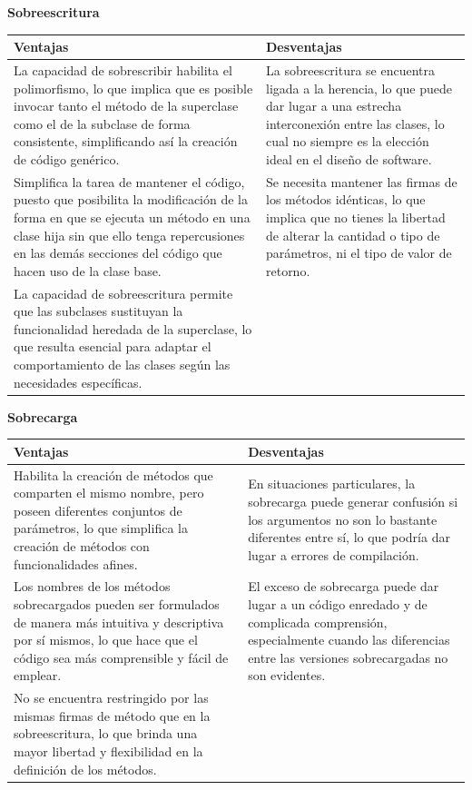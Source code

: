 \documentclass[11pt, twocolumn]{article}
\begin{document}
  \newpage
  \textbf{Sobreescritura}
  \begin{table}[h!]
    \footnotesize	
    \begin{tabular}{|p{}|p{}|}
      \hline
      \textbf{Ventajas} & \textbf{Desventajas} \\ \hline
      La capacidad de sobrescribir habilita el polimorfismo, lo que implica que es posible invocar tanto el método de la superclase como el de la subclase de forma consistente, simplificando así la creación de código genérico. & La sobreescritura se encuentra ligada a la herencia, lo que puede dar lugar a una estrecha interconexión entre las clases, lo cual no siempre es la elección ideal en el diseño de software. \\ \hline
      
      Simplifica la tarea de mantener el código, puesto que posibilita la modificación de la forma en que se ejecuta un método en una clase hija sin que ello tenga repercusiones en las demás secciones del código que hacen uso de la clase base. & Se necesita mantener las firmas de los métodos idénticas, lo que implica que no tienes la libertad de alterar la cantidad o tipo de parámetros, ni el tipo de valor de retorno. \\ \hline
      
      La capacidad de sobreescritura permite que las subclases sustituyan la funcionalidad heredada de la superclase, lo que resulta esencial para adaptar el comportamiento de las clases según las necesidades específicas. & \\ \hline
    \end{tabular}
  \end{table}

  \textbf{Sobrecarga}
  \begin{table}[h!]
    \footnotesize	
    \begin{tabular}{|p{}|p{}|}
      \hline
      \textbf{Ventajas} & \textbf{Desventajas} \\ \hline
      Habilita la creación de métodos que comparten el mismo nombre, pero poseen diferentes conjuntos de parámetros, lo que simplifica la creación de métodos con funcionalidades afines. & En situaciones particulares, la sobrecarga puede generar confusión si los argumentos no son lo bastante diferentes entre sí, lo que podría dar lugar a errores de compilación. \\ \hline

      Los nombres de los métodos sobrecargados pueden ser formulados de manera más intuitiva y descriptiva por sí mismos, lo que hace que el código sea más comprensible y fácil de emplear. & El exceso de sobrecarga puede dar lugar a un código enredado y de complicada comprensión, especialmente cuando las diferencias entre las versiones sobrecargadas no son evidentes. \\ \hline


      No se encuentra restringido por las mismas firmas de método que en la sobreescritura, lo que brinda una mayor libertad y flexibilidad en la definición de los métodos. & \\ \hline
    \end{tabular}
  \end{table}
\end{document}

